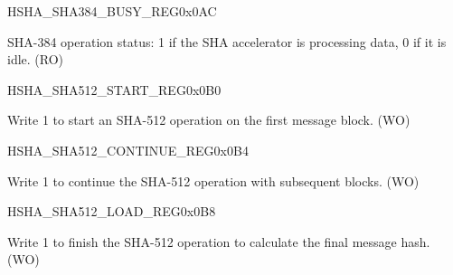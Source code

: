 \begin{register}{H}{SHA\_SHA384\_BUSY\_REG}{0x0AC}\label{regdesc:SHASHA384BUSYREG}
%
%
\regnewline%
\begin{regdesc}\begin{reglist}
\item [SHA\_SHA384\_BUSY]SHA-384 operation status: 1 if the SHA accelerator is processing data, 0 if it is idle. (RO)
\end{reglist}\end{regdesc}
\end{register}


\begin{register}{H}{SHA\_SHA512\_START\_REG}{0x0B0}\label{regdesc:SHASHA512STARTREG}
%
%
\regnewline%
\begin{regdesc}\begin{reglist}
\item [SHA\_SHA512\_START]Write 1 to start an SHA-512 operation on the first message block. (WO)
\end{reglist}\end{regdesc}
\end{register}


\begin{register}{H}{SHA\_SHA512\_CONTINUE\_REG}{0x0B4}\label{regdesc:SHASHA512CONTINUEREG}
%
%
\regnewline%
\begin{regdesc}\begin{reglist}
\item [SHA\_SHA512\_CONTINUE]Write 1 to continue the SHA-512 operation with subsequent blocks. (WO)
\end{reglist}\end{regdesc}
\end{register}


\begin{register}{H}{SHA\_SHA512\_LOAD\_REG}{0x0B8}\label{regdesc:SHASHA512LOADREG}
%
%
\regnewline%
\begin{regdesc}\begin{reglist}
\item [SHA\_SHA512\_LOAD]Write 1 to finish the SHA-512 operation to calculate the final message hash. (WO)
\end{reglist}\end{regdesc}
\end{register}


